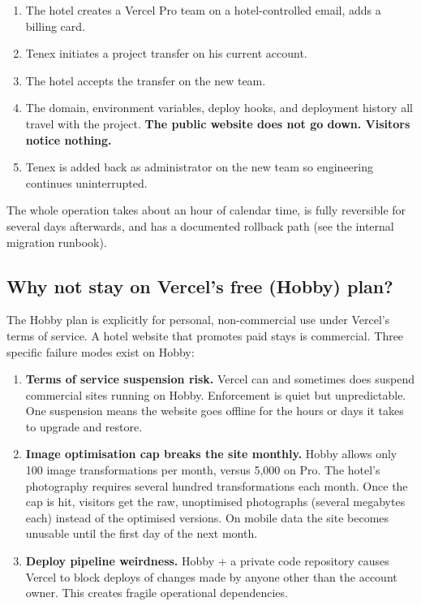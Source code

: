 \documentclass[11pt,a4paper]{article}
\begin{document}
\begin{enumerate}
\item The hotel creates a Vercel Pro team on a hotel-controlled email, adds a billing card.
\item Tenex initiates a project transfer on his current account.
\item The hotel accepts the transfer on the new team.
\item The domain, environment variables, deploy hooks, and deployment history all travel with the project. \textbf{The public website does not go down. Visitors notice nothing.}
\item Tenex is added back as administrator on the new team so engineering continues uninterrupted.
\end{enumerate}

The whole operation takes about an hour of calendar time, is fully reversible for several days afterwards, and has a documented rollback path (see the internal migration runbook).

\subsection{Why not stay on Vercel's free (Hobby) plan?}

The Hobby plan is explicitly for personal, non-commercial use under Vercel's terms of service. A hotel website that promotes paid stays is commercial. Three specific failure modes exist on Hobby:

\begin{enumerate}
\item \textbf{Terms of service suspension risk.} Vercel can and sometimes does suspend commercial sites running on Hobby. Enforcement is quiet but unpredictable. One suspension means the website goes offline for the hours or days it takes to upgrade and restore.
\item \textbf{Image optimisation cap breaks the site monthly.} Hobby allows only 100 image transformations per month, versus 5{,}000 on Pro. The hotel's photography requires several hundred transformations each month. Once the cap is hit, visitors get the raw, unoptimised photographs (several megabytes each) instead of the optimised versions. On mobile data the site becomes unusable until the first day of the next month.
\item \textbf{Deploy pipeline weirdness.} Hobby + a private code repository causes Vercel to block deploys of changes made by anyone other than the account owner. This creates fragile operational dependencies.
\end{enumerate}
\end{document}
